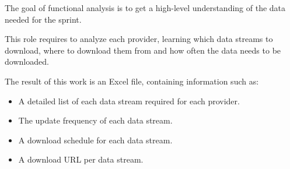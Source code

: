 The goal of functional analysis is to get a high-level understanding of the data needed for the sprint.

This role requires to analyze each provider, learning which data streams to download, where to download them from and how often the data needs to be downloaded.

The result of this work is an Excel file, containing information such as:
\begin{itemize}
    \item A detailed list of each data stream required for each provider.
    \item The update frequency of each data stream.
    \item A download schedule for each data stream.
    \item A download URL per data stream.
\end{itemize}
